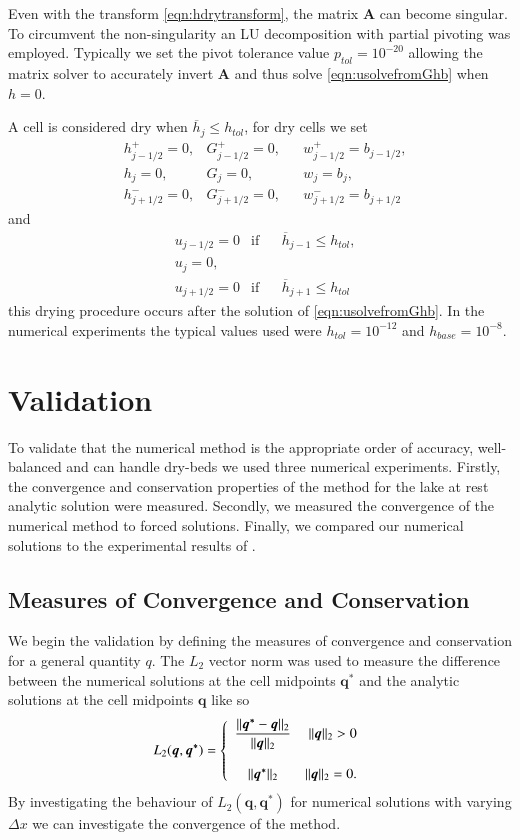 \documentclass[times]{elsarticle}
\newcommand{\matr}[1]{\mathbf{#1}}
\newcommand{\vecn}[1]{\boldsymbol{#1}}
\begin{document}
Even with the transform \eqref{eqn:hdrytransform}, the matrix $\matr{A}$ can become singular. To circumvent the non-singularity an LU decomposition with partial pivoting \cite{NumRecC-1996} was employed. Typically we set the pivot tolerance value $p_{tol} = 10^{-20}$ allowing the matrix solver to accurately invert $\matr{A}$ and thus solve \eqref{eqn:usolvefromGhb} when $h = 0$. 

A cell is considered dry when $\overline{h}_j \le h_{tol}$, for dry cells we set
\begin{align*}
& 	h^+_{j-1/2}  = 0,   & 	G^+_{j-1/2}  = 0, & & 	w^+_{j-1/2}  = b_{j-1/2},   \\
&	h_{j} = 0, & 	G_{j}  = 0,  & 	&w_{j}  = b_{j},\\
& 	h^-_{j+1/2}  = 0,  & 	G^-_{j+1/2}  = 0, & 	&w^-_{j+1/2}  = b_{j+1/2} 
\end{align*}
and
\begin{align*}
& 	u_{j-1/2}  = 0  &\text{if}& &\overline{h}_{j-1}\le h_{tol}, \\
& 	u_{j}  = 0, \\
& 	u_{j+1/2}  = 0  &\text{if}& &\overline{h}_{j+1} \le h_{tol}
\end{align*}
this drying procedure occurs after the solution of \eqref{eqn:usolvefromGhb}. In the numerical experiments the typical values used were $h_{tol} = 10^{-12}$ and $h_{base} = 10^{-8}$.

\section{Validation}
To validate that the numerical method is the appropriate order of accuracy, well-balanced and can handle dry-beds we used three numerical experiments. Firstly, the convergence and conservation properties of the method for the lake at rest analytic solution were measured. Secondly, we measured the convergence of the numerical method to forced solutions. Finally, we compared our numerical solutions to the experimental results of \citet{Synolakis-1987-523}.


\subsection{Measures of Convergence and Conservation}
We begin the validation by defining the measures of convergence and conservation for a general quantity $q$. The $L_2$ vector norm was used to measure the difference between the numerical solutions at the cell midpoints $\vecn{q^*}$ and the analytic solutions at the cell midpoints $\vecn{q}$ like so
\begin{equation*}
L_2(\vecn{q},\vecn{q^*}) =  \left\lbrace \begin{array}{c r} 
\dfrac{||\vecn{q^*} - \vecn{q}||_{2}}{||\vecn{q}||_{2}} & ||\vecn{q}||_{2} > 0 \\ \\
{||\vecn{q^*}||_{2}} & ||\vecn{q}||_{2} = 0 . \end{array}\right. 
\label{eqn:L1qdef} 
\end{equation*} 
By investigating the behaviour of $L_2(\vecn{q},\vecn{q^*})$ for numerical solutions with varying $\Delta x$ we can investigate the convergence of the method. 
\end{document}
